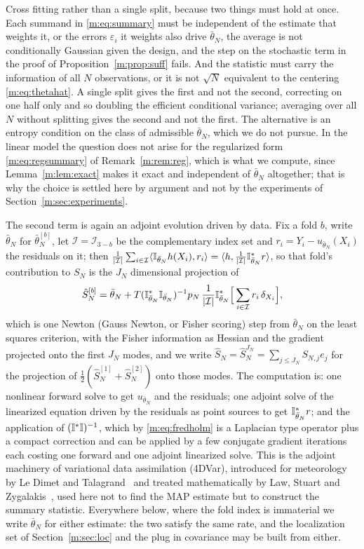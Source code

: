 Cross fitting rather than a single split, because two things must hold at once. Each summand in \eqref{m:eq:summary} must be independent of the estimate that weights it, or the errors $\varepsilon_i$ it weights also drive $\bar\theta_N$, the average is not conditionally Gaussian given the design, and the step on the stochastic term in the proof of Proposition~\ref{m:prop:suff} fails. And the statistic must carry the information of all $N$ observations, or it is not $\sqrt N$ equivalent to the centering \eqref{m:eq:thetahat}. A single split gives the first and not the second, correcting on one half only and so doubling the efficient conditional variance; averaging over all $N$ without splitting gives the second and not the first. The alternative is an entropy condition on the class of admissible $\bar\theta_N$, which we do not pursue. In the linear model the question does not arise for the regularized form \eqref{m:eq:regsummary} of Remark~\ref{m:rem:reg}, which is what we compute, since Lemma~\ref{m:lem:exact} makes it exact and independent of $\bar\theta_N$ altogether; that is why the choice is settled here by argument and not by the experiments of Section~\ref{m:sec:experiments}.

The second term is again an adjoint evolution driven by data. Fix a fold $b$, write $\bar\theta_N$ for $\bar\theta^{[b]}_N$, let $\mathcal I=\mathcal I_{3-b}$ be the complementary index set and $r_i=Y_i-u_{\bar\theta_N}(X_i)$ the residuals on it; then $\frac1{|\mathcal I|}\sum_{i\in\mathcal I}\langle\mathbb{I}_{\bar\theta_N}h(X_i),r_i\rangle=\langle h,\frac1{|\mathcal I|}\mathbb{I}^*_{\bar\theta_N}r\rangle$, so that fold's contribution to $S_N$ is the $J_N$ dimensional projection of
\begin{equation}\label{m:eq:onestep}
\hat S^{[b]}_N=\bar\theta_N+T(\mathbb{I}^*_{\bar\theta_N}\mathbb{I}_{\bar\theta_N})^{-1}p_N\,\frac1{|\mathcal I|}\mathbb{I}^*_{\bar\theta_N}\Big[\sum_{i\in\mathcal I}r_i\,\delta_{X_i}\Big],
\end{equation}
which is one Newton (Gauss Newton, or Fisher scoring) step from $\bar\theta_N$ on the least squares criterion, with the Fisher information as Hessian and the gradient projected onto the first $J_N$ modes, and we write $\hat S_N=\hat S^{J_N}_N=\sum_{j\le J_N}S_{N,j}e_j$ for the projection of $\frac12(\hat S^{[1]}_N+\hat S^{[2]}_N)$ onto those modes. The computation is: one nonlinear forward solve to get $u_{\bar\theta_N}$ and the residuals; one adjoint solve of the linearized equation driven by the residuals as point sources to get $\mathbb{I}^*_{\bar\theta_N}r$; and the application of $(\mathbb{I}^*\mathbb{I})^{-1}$, which by \eqref{m:eq:fredholm} is a Laplacian type operator plus a compact correction and can be applied by a few conjugate gradient iterations each costing one forward and one adjoint linearized solve. This is the adjoint machinery of variational data assimilation (4DVar), introduced for meteorology by Le Dimet and Talagrand~\cite{ledimettalagrand1986} and treated mathematically by Law, Stuart and Zygalakis~\cite{law2015}, used here not to find the MAP estimate but to construct the summary statistic. Everywhere below, where the fold index is immaterial we write $\bar\theta_N$ for either estimate: the two satisfy the same rate, and the localization set of Section~\ref{m:sec:loc} and the plug in covariance may be built from either.

